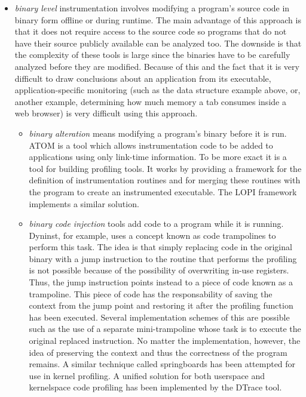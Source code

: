 \begin{itemize}
\begin{itemize}
\end{itemize}
\item \textit{binary level} instrumentation involves modifying a program's source code in binary form offline or during runtime. The main advantage of this approach is that it does not require access to the source code so programs that do not have their source publicly available can be analyzed too. The downside is that the complexity of these tools is large since the binaries have to be carefully analyzed before they are modified. Because of this and the fact that it is very difficult to draw conclusions about an application from its executable, application-specific monitoring (such as the data structure example above, or, another example, determining how much memory a tab consumes inside a web browser) is very difficult using this approach.
\begin{itemize}
\item \textit{binary alteration} means modifying a program's binary before it is run. ATOM\cite{Srivastava94} is a tool which allows instrumentation code to be added to applications using only link-time information. To be more exact it is a tool for building profiling tools. It works by providing a framework for the definition of instrumentation routines and for merging these routines with the program to create an instrumented executable. The LOPI framework\cite{Kagstrom05} implements a similar solution.
\item \textit{binary code injection} tools add code to a program while it is running. Dyninst\cite{Buck00}, for example, uses a concept known as code trampolines to perform this task. The idea is that simply replacing code in the original binary with a jump instruction to the routine that performs the profiling is not possible because of the possibility of overwriting in-use registers. Thus, the jump instruction points instead to a piece of code known as a trampoline. This piece of code has the responsability of saving the context from the jump point and restoring it after the profiling function has been executed. Several implementation schemes of this are possible such as the use of a separate mini-trampoline whose task is to execute the original replaced instruction. No matter the implementation, however, the idea of preserving the context and thus the correctness of the program remains. A similar technique called springboards has been attempted for use in kernel profiling\cite{Tamches99}. A unified solution for both userspace and kernelspace code profiling has been implemented by the DTrace tool\cite{Cantrill04}.

\end{itemize}
\end{itemize}

